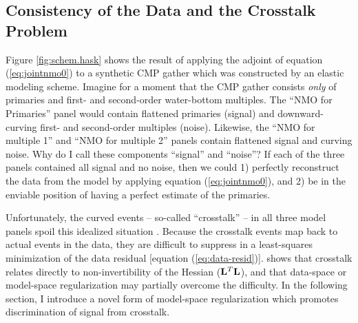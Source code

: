 \subsection{Consistency of the Data and the Crosstalk Problem}
Figure \ref{fig:schem.hask} shows the result of applying the adjoint of equation 
(\ref{eq:jointnmo0}) to a synthetic CMP gather which was constructed by an elastic modeling
scheme.  Imagine for a moment that the CMP gather consists {\em only} of primaries and
first- and second-order water-bottom multiples.   The ``NMO for Primaries'' panel would
contain flattened primaries (signal) and downward-curving first- and second-order 
multiples (noise).  Likewise, the ``NMO for multiple 1'' and ``NMO for multiple 2''
panels contain flattened signal and curving noise.  Why do I call these
components ``signal'' and ``noise''?  If each of the three panels contained all signal and 
no noise, then we could 1) perfectly reconstruct the data from the model by applying 
equation (\ref{eq:jointnmo0}), and 2) be in the enviable position of having a perfect 
estimate of the primaries.  
\par
Unfortunately, the curved events -- so-called ``crosstalk'' -- in all three model panels 
spoil this idealized situation \cite{Claerbout.blackwell.92}.  Because the crosstalk events 
map back to actual events in the data, they are difficult to suppress in a least-squares 
minimization of the data residual [equation (\ref{eq:data-resid})].  
shows that crosstalk relates directly to non-invertibility of the Hessian ($\bold L^T \bold L$), 
and that data-space or model-space regularization may partially overcome the difficulty.
In the following section, I introduce a novel form of model-space regularization which 
promotes discrimination of signal from crosstalk.

